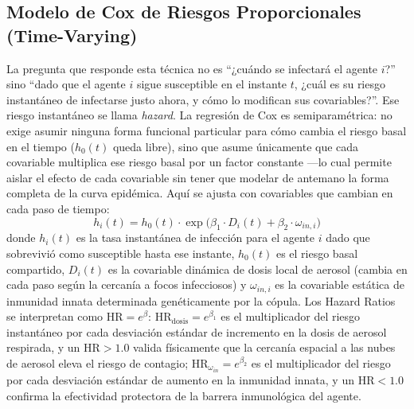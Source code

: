 \documentclass[conference]{IEEEtran}
\begin{document}
\subsection{Modelo de Cox de Riesgos Proporcionales (Time-Varying)}
La pregunta que responde esta técnica no es ``¿cuándo se infectará el agente $i$?'' sino ``dado que el agente $i$ sigue susceptible en el instante $t$, ¿cuál es su riesgo instantáneo de infectarse justo ahora, y cómo lo modifican sus covariables?''. Ese riesgo instantáneo se llama \emph{hazard}. La regresión de Cox es semiparamétrica: no exige asumir ninguna forma funcional particular para cómo cambia el riesgo basal en el tiempo ($h_0(t)$ queda libre), sino que asume únicamente que cada covariable multiplica ese riesgo basal por un factor constante ---lo cual permite aislar el efecto de cada covariable sin tener que modelar de antemano la forma completa de la curva epidémica. Aquí se ajusta con covariables que cambian en cada paso de tiempo:
\begin{equation}
h_i(t) = h_0(t) \cdot \exp\!\Big(\beta_1 \cdot D_i(t) + \beta_2 \cdot \omega_{in,i}\Big)
\end{equation}
donde $h_i(t)$ es la tasa instantánea de infección para el agente $i$ dado que sobrevivió como susceptible hasta ese instante, $h_0(t)$ es el riesgo basal compartido, $D_i(t)$ es la covariable dinámica de dosis local de aerosol (cambia en cada paso según la cercanía a focos infecciosos) y $\omega_{in,i}$ es la covariable estática de inmunidad innata determinada genéticamente por la cópula. Los Hazard Ratios se interpretan como $\text{HR}=e^\beta$: $\text{HR}_{\text{dosis}}=e^{\beta_1}$ es el multiplicador del riesgo instantáneo por cada desviación estándar de incremento en la dosis de aerosol respirada, y un $\text{HR}>1.0$ valida físicamente que la cercanía espacial a las nubes de aerosol eleva el riesgo de contagio; $\text{HR}_{\omega_{in}}=e^{\beta_2}$ es el multiplicador del riesgo por cada desviación estándar de aumento en la inmunidad innata, y un $\text{HR}<1.0$ confirma la efectividad protectora de la barrera inmunológica del agente.
\end{document}
